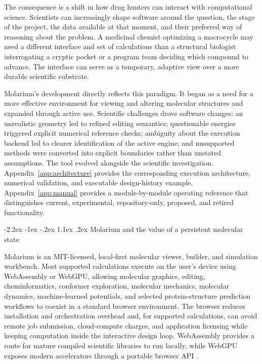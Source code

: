 \documentclass[11pt]{article}
\makeatletter
\renewcommand\section{\@startsection{section}{1}{\z@}%
  {-2.2ex \@plus -1ex \@minus -.2ex}%
  {1.1ex \@plus .2ex}%
  {\normalfont\Large\bfseries\color{molblue}}}
\makeatother
\begin{document}
The consequence is a shift in how drug hunters can interact with computational science. Scientists can increasingly shape software around the question, the stage of the project, the data available at that moment, and their preferred way of reasoning about the problem. A medicinal chemist optimizing a macrocycle may need a different interface and set of calculations than a structural biologist interrogating a cryptic pocket or a program team deciding which compound to advance. The interface can serve as a temporary, adaptive view over a more durable scientific substrate.

Molarium's development directly reflects this paradigm. It began as a need for a more effective environment for viewing and altering molecular structures and expanded through active use. Scientific challenges drove software changes: an unrealistic geometry led to refined editing semantics; questionable energies triggered explicit numerical reference checks; ambiguity about the execution backend led to clearer identification of the active engine; and unsupported methods were converted into explicit boundaries rather than unstated assumptions. The tool evolved alongside the scientific investigation. Appendix~\ref{app:architecture} provides the corresponding execution architecture, numerical validation, and executable design-history example. Appendix~\ref{app:manual} provides a module-by-module operating reference that distinguishes current, experimental, repository-only, proposed, and retired functionality.

\section{Molarium and the value of a persistent molecular state}

Molarium is an MIT-licensed, local-first molecular viewer, builder, and simulation workbench. Most supported calculations execute on the user's device using WebAssembly or WebGPU, allowing molecular graphics, editing, cheminformatics, conformer exploration, molecular mechanics, molecular dynamics, machine-learned potentials, and selected protein-structure prediction workflows to coexist in a standard browser environment. The browser reduces installation and orchestration overhead and, for supported calculations, can avoid remote job submission, cloud-compute charges, and application licensing while keeping computation inside the interactive design loop. WebAssembly provides a route for mature compiled scientific libraries to run locally, while WebGPU exposes modern accelerators through a portable browser API \citep{haas2017wasm,webgpu2025}.
\end{document}
